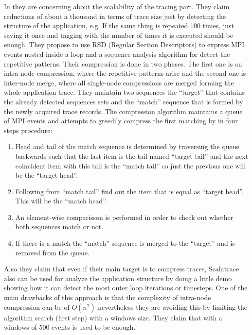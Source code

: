 In \cite{noeth2009scalatrace} they are concerning about the scalability of the
tracing part. They claim reductions of about a
thousand in terms of trace size just by detecting the structure of the
application, e.g. If the same thing is repeated 100 times, just saving it once
and tagging with the number of times it is executed should be enough. They
propose to use RSD (Regular Section Descriptors) to express MPI events nested
inside a loop and a sequence analysis algorithm for detect the repetitive 
patterns. Their compression
is done in two phases. The first one is an intra-node compression, where the
repetitive patterns arise and the second one is inter-node merge, where all
single-node compressions are merged forming the whole application trace.
They maintain two sequences the ``target'' that contains the already detected
sequences sets and the ``match'' sequence that is formed by the newly acquired
trace records. The compression algorithm maintains a queue of MPI events and 
attempts to greedily compress the first matching by  in four steps procedure:
\begin{enumerate}[label=\roman*)]
  \item Head and tail of the match sequence is determined by traversing the
    queue backwards such that the last item is the tail named ``target tail''
    and the next coincident item with this tail is the ``match tail'' so just
    the previous one will be the ``target head''.
  \item Following from ``match tail'' find out the item that is equal as
    ``target head''. This will be the ``match head''.
  \item An element-wise comparisson is performed in order to check out whether 
    both sequences match or not.
  \item If there is a match the ``match'' sequence is merged to the ``target''
    and is removed from the queue.
\end{enumerate}
Also they claim
that even if their main target is to compress traces, Scalatrace also can be
used for analyze the application structure by doing a little demo showing how it
can detect the most outer loop iterations or timesteps. One of the main
drawbacks of this approach is that the complexity of intra-node compression 
can be of $O(n^2)$ nevertheless they are avoiding this by
limiting the algorithm search (first step) with a windows size. They claim that
with a windows of 500 events is used to be enough. 

